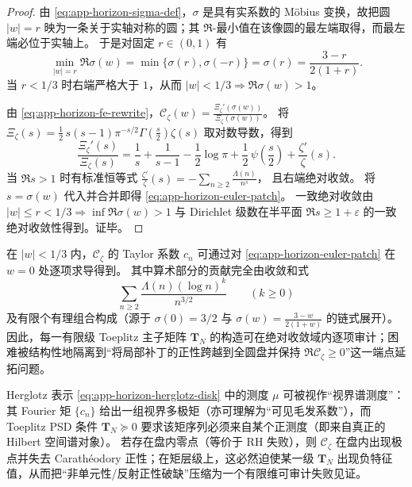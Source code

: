 \begin{proof}
由 \eqref{eq:app-horizon-sigma-def}，\(\sigma\) 是具有实系数的 Möbius 变换，故把圆 \(|w|=r\) 映为一条关于实轴对称的圆；其 \(\Re\)-最小值在该像圆的最左端取得，而最左端必位于实轴上。
于是对固定 \(r\in(0,1)\) 有
\[
\min_{|w|=r}\Re\sigma(w)=\min\{\sigma(r),\sigma(-r)\}=\sigma(r)=\frac{3-r}{2(1+r)}.
\]
当 \(r<1/3\) 时右端严格大于 \(1\)，从而 \(|w|<1/3\Rightarrow \Re\sigma(w)>1\)。
\par
由 \eqref{eq:app-horizon-fe-rewrite}，\(\mathscr{C}_{\zeta}(w)=\frac{\Xi_{\zeta}'(\sigma(w))}{\Xi_{\zeta}(\sigma(w))}\)。
将 \(\Xi_{\zeta}(s)=\frac12\,s(s-1)\pi^{-s/2}\Gamma(\tfrac{s}{2})\zeta(s)\) 取对数导数，得到
\[
\frac{\Xi_{\zeta}'(s)}{\Xi_{\zeta}(s)}
=\frac{1}{s}+\frac{1}{s-1}-\frac12\log\pi+\frac12\,\psi\!\left(\frac{s}{2}\right)+\frac{\zeta'}{\zeta}(s).
\]
当 \(\Re s>1\) 时有标准恒等式
\(
\frac{\zeta'}{\zeta}(s)=-\sum_{n\ge 2}\frac{\Lambda(n)}{n^s}
\)，
且右端绝对收敛。
将 \(s=\sigma(w)\) 代入并合并即得 \eqref{eq:app-horizon-euler-patch}。
一致绝对收敛由 \(|w|\le r<1/3\Rightarrow \inf\Re\sigma(w)>1\) 与 Dirichlet 级数在半平面 \(\Re s\ge 1+\varepsilon\) 的一致绝对收敛性得到。证毕。
\end{proof}

\begin{corollary}\label{cor:app-horizon-prime-moment-interface}
在 \(|w|<1/3\) 内，\(\mathscr{C}_{\zeta}\) 的 Taylor 系数 \(c_n\) 可通过对 \eqref{eq:app-horizon-euler-patch} 在 \(w=0\) 处逐项求导得到。
其中算术部分的贡献完全由收敛和式
\[
\sum_{n\ge2}\frac{\Lambda(n)(\log n)^k}{n^{3/2}}
\qquad(k\ge 0)
\]
及有限个有理组合构成（源于 \(\sigma(0)=3/2\) 与 \(\sigma(w)=\frac{3-w}{2(1+w)}\) 的链式展开）。
因此，每一有限级 Toeplitz 主子矩阵 \(\mathbf{T}_N\) 的构造可在绝对收敛域内逐项审计；困难被结构性地隔离到“将局部补丁的正性跨越到全圆盘并保持 \(\Re\mathscr{C}_{\zeta}\ge 0\)”这一端点延拓问题。
\end{corollary}

\begin{remark}\label{rem:app-horizon-multipole-positivity-hair}
Herglotz 表示 \eqref{eq:app-horizon-herglotz-disk} 中的测度 \(\mu\) 可被视作“视界谱测度”：
其 Fourier 矩 \(\{c_n\}\) 给出一组视界多极矩（亦可理解为“可见毛发系数”），而 Toeplitz PSD 条件 \(\mathbf{T}_N\succeq 0\) 要求该矩序列必须来自某个正测度（即来自真正的 Hilbert 空间谱对象）。
若存在盘内零点（等价于 RH 失败），则 \(\mathscr{C}_{\zeta}\) 在盘内出现极点并失去 Carath\'eodory 正性；在矩层级上，这必然迫使某一级 \(\mathbf{T}_N\) 出现负特征值，从而把“非单元性/反射正性破缺”压缩为一个有限维可审计失败见证。
\end{remark}


\endinput
